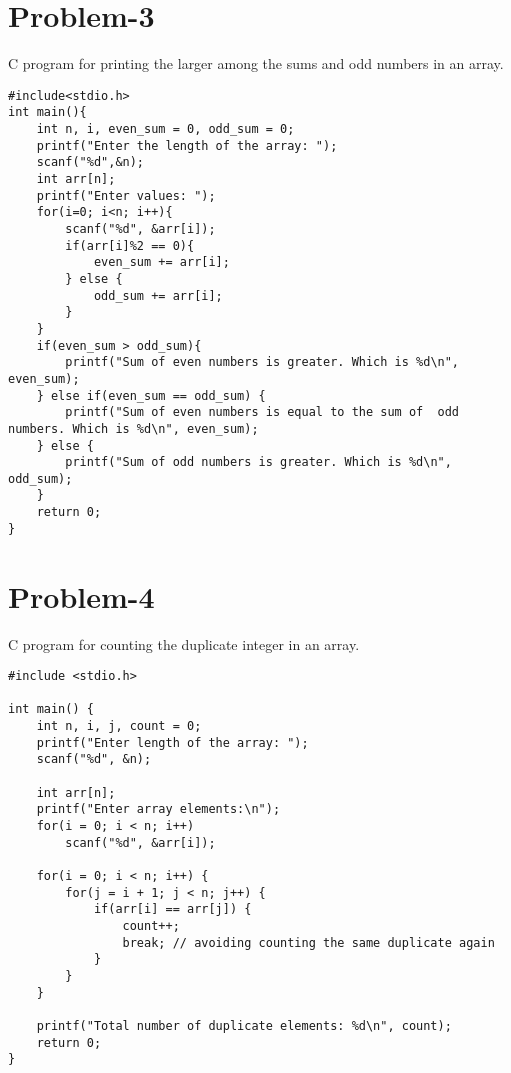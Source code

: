 \documentclass{article}
\begin{document}
\section*{Problem-3} C program for printing the larger among the sums and odd numbers in an array. 
\begin{lstlisting}
#include<stdio.h>
int main(){
    int n, i, even_sum = 0, odd_sum = 0;
    printf("Enter the length of the array: ");
    scanf("%d",&n);
    int arr[n];
    printf("Enter values: ");
    for(i=0; i<n; i++){
        scanf("%d", &arr[i]);
        if(arr[i]%2 == 0){
            even_sum += arr[i];
        } else {
            odd_sum += arr[i];
        }
    }
    if(even_sum > odd_sum){
        printf("Sum of even numbers is greater. Which is %d\n", even_sum);
    } else if(even_sum == odd_sum) {
        printf("Sum of even numbers is equal to the sum of  odd numbers. Which is %d\n", even_sum);
    } else {
        printf("Sum of odd numbers is greater. Which is %d\n", odd_sum);
    }
    return 0;
}
\end{lstlisting}

\newpage
\section*{Problem-4} C program for counting the duplicate integer in an array. 
\begin{lstlisting}
#include <stdio.h>

int main() {
    int n, i, j, count = 0;
    printf("Enter length of the array: ");
    scanf("%d", &n);

    int arr[n];
    printf("Enter array elements:\n");
    for(i = 0; i < n; i++)
        scanf("%d", &arr[i]);

    for(i = 0; i < n; i++) {
        for(j = i + 1; j < n; j++) {
            if(arr[i] == arr[j]) {
                count++;
                break; // avoiding counting the same duplicate again
            }
        }
    }

    printf("Total number of duplicate elements: %d\n", count);
    return 0;
}
\end{lstlisting}
\end{document}
